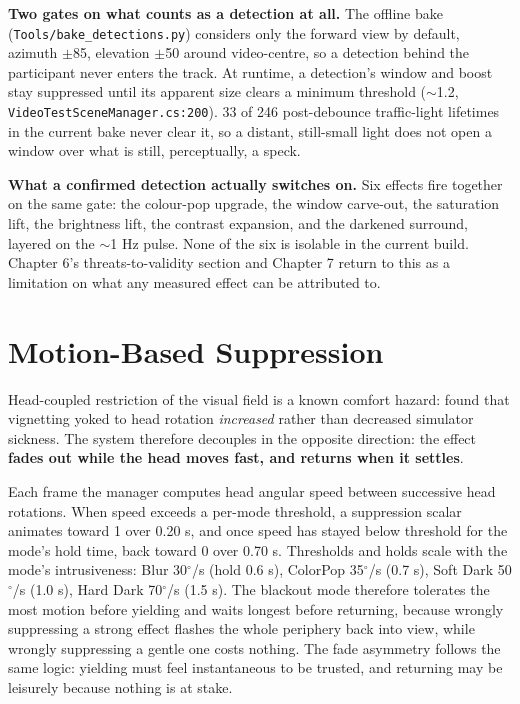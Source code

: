 \textbf{Two gates on what counts as a detection at all.} The offline bake
(\verb|Tools/bake_detections.py|) considers only the forward view by default, azimuth $\pm$85\textdegree{},
elevation $\pm$50\textdegree{} around video-centre, so a detection behind the participant never enters the
track. At runtime, a detection's window and boost stay suppressed until its apparent size clears a
minimum threshold ($\sim$1.2\textdegree{}, \verb|VideoTestSceneManager.cs:200|). 33 of 246 post-debounce
traffic-light lifetimes in the current bake never clear it, so a distant, still-small light does not
open a window over what is still, perceptually, a speck.

\textbf{What a confirmed detection actually switches on.} Six effects fire together on the same
gate: the colour-pop upgrade, the window carve-out, the saturation lift, the brightness lift, the
contrast expansion, and the darkened surround, layered on the $\sim$1 Hz pulse. None of the six is
isolable in the current build. Chapter 6's threats-to-validity section and Chapter 7 return to this
as a limitation on what any measured effect can be attributed to.

\section{Motion-Based Suppression}

Head-coupled restriction of the visual field is a known comfort hazard: \citet{norouzi2018} found
that vignetting yoked to head rotation \textit{increased} rather than decreased simulator sickness. The
system therefore decouples in the opposite direction: the effect \textbf{fades out while the head moves
fast, and returns when it settles}.

Each frame the manager computes head angular speed between successive head rotations. When speed
exceeds a per-mode threshold, a suppression scalar animates toward 1 over 0.20 s, and once speed has
stayed below threshold for the mode's hold time, back toward 0 over 0.70 s. Thresholds and holds
scale with the mode's intrusiveness: Blur 30$^{\circ}$/s (hold 0.6 s), ColorPop 35$^{\circ}$/s (0.7 s),
Soft Dark 50$^{\circ}$/s (1.0 s), Hard Dark 70$^{\circ}$/s (1.5 s). The blackout mode therefore tolerates
the most motion before yielding and waits longest before returning, because wrongly suppressing a
strong effect flashes the whole periphery back into view, while wrongly suppressing a gentle one
costs nothing. The fade asymmetry follows the same logic: yielding must feel instantaneous to be
trusted, and returning may be leisurely because nothing is at stake.

